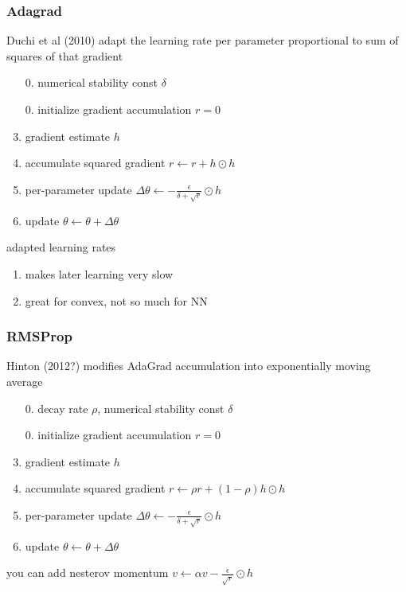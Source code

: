 \documentclass[]{article}
\begin{document}
\subsubsection{Adagrad}%
\label{ssub:adagrad}

Duchi et al (2010) adapt the learning rate per parameter proportional to sum of squares of that gradient
\begin{enumerate}
    \item[0.] numerical stability const $\delta$
    \item[0.] initialize gradient accumulation $r = 0$
    \item gradient estimate $h$
    \item accumulate squared gradient $r \gets r + h \odot h$
    \item per-parameter update $\Delta \theta \gets - \frac{\epsilon}{\delta + \sqrt{r}} \odot h$
    \item update $\theta \gets \theta + \Delta \theta$
\end{enumerate}


adapted learning rates
\begin{enumerate}
    \item makes later learning very slow
    \item great for convex, not so much for NN
\end{enumerate}

\subsubsection{RMSProp}%
\label{ssub:rmsprop}

Hinton (2012?) modifies AdaGrad accumulation into exponentially moving average
\begin{enumerate}
    \item[0.] decay rate $\rho$, numerical stability const $\delta$
    \item[0.] initialize gradient accumulation $r = 0$
    \item gradient estimate $h$
    \item accumulate squared gradient $r \gets \rho r + (1 - \rho) h \odot h$
    \item per-parameter update $\Delta \theta \gets - \frac{\epsilon}{\delta + \sqrt{r}} \odot h$
    \item update $\theta \gets \theta + \Delta \theta$
\end{enumerate}

you can add nesterov momentum $v \gets \alpha v - \frac{\epsilon}{\sqrt{r}} \odot h$ \hfill
\end{document}
